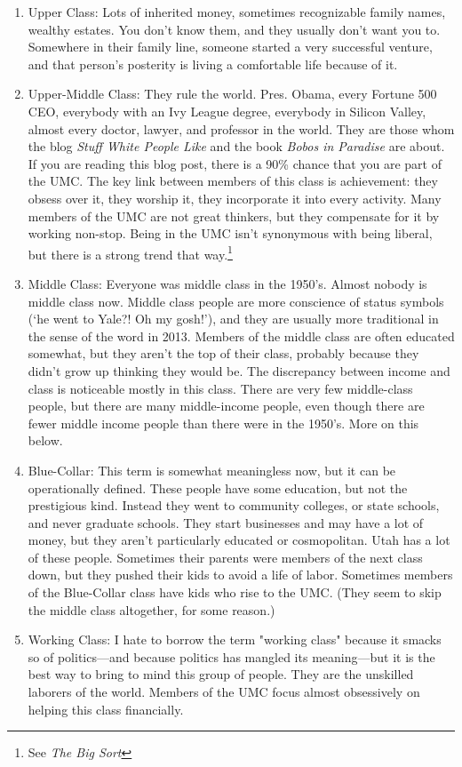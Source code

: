 \documentclass[11pt, oneside]{article}   	%
\begin{document}
\begin{enumerate}
\item Upper Class: Lots of inherited money, sometimes recognizable family names, wealthy estates.  You don't know them, and they usually don't want you to.  Somewhere in their family line, someone started a very successful venture, and that person's posterity is living a comfortable life because of it.
\item Upper-Middle Class: They rule the world.  Pres. Obama, every Fortune 500 CEO, everybody with an Ivy League degree, everybody in Silicon Valley, almost every doctor, lawyer, and professor in the world.  They are those whom the blog \textit{Stuff White People Like} and the book \textit{Bobos in Paradise} are about.  If you are reading this blog post, there is a 90\% chance that you are part of the UMC.  The key link between members of this class is achievement: they obsess over it, they worship it, they incorporate it into every activity.  Many members of the UMC are not great thinkers, but they compensate for it by working non-stop.  Being in the UMC isn't synonymous with being liberal, but there is a strong trend that way.\footnote{See \textit{The Big Sort}}
\item Middle Class: Everyone was middle class in the 1950's.  Almost nobody is middle class now.  Middle class people are more conscience of status symbols (`he went to Yale?! Oh my gosh!'), and they are usually more traditional in the sense of the word in 2013.  Members of the middle class are often educated somewhat, but they aren't the top of their class, probably because they didn't grow up thinking they would be.  The discrepancy between income and class is noticeable mostly in this class.  There are very few middle-class people, but there are many middle-income people, even though there are fewer middle income people than there were in the 1950's.  More on this below.  
\item  Blue-Collar:  This term is somewhat meaningless now, but it can be operationally defined.  These people have some education, but not the prestigious kind.  Instead they went to community colleges, or state schools, and never graduate schools.  They start businesses and may have a lot of money, but they aren't particularly educated or cosmopolitan.  Utah has a lot of these people.  Sometimes their parents were members of the next class down, but they pushed their kids to avoid a life of labor.  Sometimes members of the Blue-Collar class have kids who rise to the UMC.  (They seem to skip the middle class altogether, for some reason.)     
\item Working Class:  I hate to borrow the term "working class" because it smacks so of politics---and because politics has mangled its meaning---but it is the best way to bring to mind this group of people.  They are the unskilled laborers of the world.  Members of the UMC focus almost obsessively on helping this class financially.
\end{enumerate}
\end{document}
